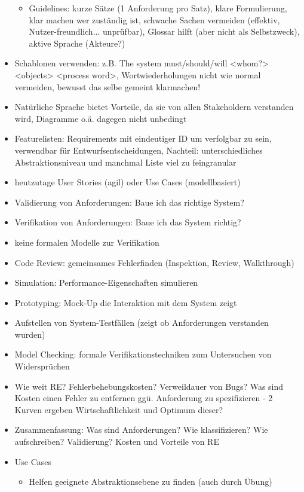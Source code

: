 \documentclass[paper=a4, fontsize=11pt]{scrartcl} %
\numberwithin{equation}{section} %
\numberwithin{figure}{section} %
\numberwithin{table}{section} %
\begin{document}
\begin{itemize}
\begin{itemize}
    \item Guidelines: kurze Sätze (1 Anforderung pro Satz), klare Formulierung, klar machen wer zuständig ist, schwache Sachen vermeiden (effektiv, Nutzer-freundlich... unprüfbar), Glossar hilft (aber nicht als Selbstzweck), aktive Sprache (Akteure?)
  \end{itemize}
  \item Schablonen verwenden: z.B. The system must/should/will <whom?> <objects> <process word>, Wortwiederholungen nicht wie normal vermeiden, bewusst das selbe gemeint klarmachen!
  \item Natürliche Sprache bietet Vorteile, da sie von allen Stakeholdern verstanden wird, Diagramme o.ä. dagegen nicht unbedingt
  \item Featurelisten: Requirements mit eindeutiger ID um verfolgbar zu sein, verwendbar für Entwurfsentscheidungen, Nachteil: unterschiedliches Abstraktionsniveau und manchmal Liste viel zu feingranular
  \item heutzutage User Stories (agil) oder Use Cases (modellbasiert)
  \item Validierung von Anforderungen: Baue ich das richtige System?
  \item Verifikation von Anforderungen: Baue ich das System richtig?
  \item keine formalen Modelle zur Verifikation
  \item Code Review: gemeinsames Fehlerfinden (Inspektion, Review, Walkthrough)
  \item Simulation: Performance-Eigenschaften simulieren
  \item Prototyping: Mock-Up die Interaktion mit dem System zeigt
  \item Aufstellen von System-Testfällen (zeigt ob Anforderungen verstanden wurden)
  \item Model Checking: formale Verifikationstechniken zum Untersuchen von Widersprüchen
  \item Wie weit RE? Fehlerbehebungskosten? Verweildauer von Bugs? Was sind Kosten einen Fehler zu entfernen ggü. Anforderung zu spezifizieren - 2 Kurven ergeben Wirtschaftlichkeit und Optimum dieser?
  \item Zusammenfassung: Was sind Anforderungen? Wie klassifizieren? Wie aufschreiben? Validierung? Kosten und Vorteile von RE
  \item{Use Cases}
  \begin{itemize}
    \item Helfen geeignete Abstraktionsebene zu finden (auch durch Übung)

\end{itemize}
\end{itemize}
\end{document}
